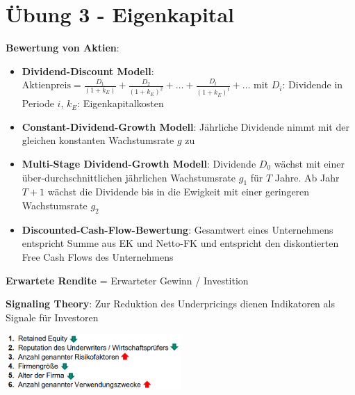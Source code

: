\section{Übung 3 - Eigenkapital}

\textbf{Bewertung von Aktien}:
\begin{itemize}
	\item \textbf{Dividend-Discount Modell}: $\text{Aktienpreis}=\frac{D_1}{(1+k_E)}+\frac{D_2}{(1+k_E)^2}+\ldots+\frac{D_t}{(1+k_E)^t}+\ldots$ mit $D_i$: Dividende in Periode $i$, $k_E$: Eigenkapitalkosten
	\item \textbf{Constant-Dividend-Growth Modell}: Jährliche Dividende nimmt mit der gleichen konstanten Wachstumsrate $g$ zu
	\item \textbf{Multi-Stage Dividend-Growth Modell}: Dividende $D_0$ wächst mit einer über-durchschnittlichen jährlichen Wachstumsrate $g_1$ für $T$ Jahre. Ab Jahr $T+1$ wächst die Dividende bis in die Ewigkeit mit einer geringeren Wachstumsrate $g_2$
	\item \textbf{Discounted-Cash-Flow-Bewertung}: Gesamtwert eines Unternehmens entspricht Summe aus EK und Netto-FK und entspricht den diskontierten Free Cash Flows des Unternehmens 
\end{itemize}
\bigskip
\textbf{Erwartete Rendite} = Erwarteter Gewinn / Investition

\textbf{Signaling Theory}: Zur Reduktion des Underpricings dienen Indikatoren als Signale für Investoren
\begin{center}
	\includegraphics[width=0.5\textwidth]{images/e6.png}
\end{center}